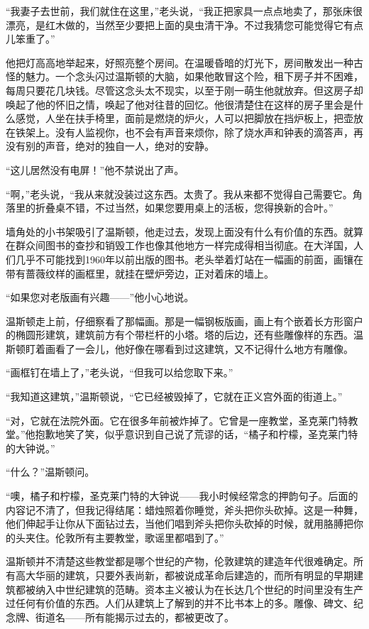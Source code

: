 ``我妻子去世前，我们就住在这里，''老头说，``我正把家具一点点地卖了，那张床很漂亮，是红木做的，当然至少要把上面的臭虫清干净。不过我猜您可能觉得它有点儿笨重了。''

他把灯高高地举起来，好照亮整个房间。在温暖昏暗的灯光下，房间散发出一种古怪的魅力。一个念头闪过温斯顿的大脑，如果他敢冒这个险，租下房子并不困难，每周只要花几块钱。尽管这念头太不现实，以至于刚一萌生他就放弃。但这房子却唤起了他的怀旧之情，唤起了他对往昔的回忆。他很清楚住在这样的房子里会是什么感觉，人坐在扶手椅里，面前是燃烧的炉火，人可以把脚放在挡炉板上，把壶放在铁架上。没有人监视你，也不会有声音来烦你，除了烧水声和钟表的滴答声，再没有别的声音，绝对的独自一人，绝对的安静。

``这儿居然没有电屏！''他不禁说出了声。

``啊，''老头说，``我从来就没装过这东西。太贵了。我从来都不觉得自己需要它。角落里的折叠桌不错，不过当然，如果您要用桌上的活板，您得换新的合叶。''

墙角处的小书架吸引了温斯顿，他走过去，发现上面没有什么有价值的东西。就算在群众间图书的查抄和销毁工作也像其他地方一样完成得相当彻底。在大洋国，人们几乎不可能找到1960年以前出版的图书。老头举着灯站在一幅画的前面，画镶在带有蔷薇纹样的画框里，就挂在壁炉旁边，正对着床的墙上。

``如果您对老版画有兴趣——''他小心地说。

温斯顿走上前，仔细察看了那幅画。那是一幅钢板版画，画上有个嵌着长方形窗户的椭圆形建筑，建筑前方有个带栏杆的小塔。塔的后边，还有些雕像样的东西。温斯顿盯着画看了一会儿，他好像在哪看到过这建筑，又不记得什么地方有雕像。

``画框钉在墙上了，''老头说，``但我可以给您取下来。''

``我知道这建筑，''温斯顿说，``它已经被毁掉了，它就在正义宫外面的街道上。''

``对，它就在法院外面。它在很多年前被炸掉了。它曾是一座教堂，圣克莱门特教堂。''他抱歉地笑了笑，似乎意识到自己说了荒谬的话，``橘子和柠檬，圣克莱门特的大钟说。''

``什么？''温斯顿问。

``噢，橘子和柠檬，圣克莱门特的大钟说——我小时候经常念的押韵句子。后面的内容记不清了，但我记得结尾：蜡烛照着你睡觉，斧头把你头砍掉。这是一种舞，他们伸起手让你从下面钻过去，当他们唱到斧头把你头砍掉的时候，就用胳膊把你的头夹住。伦敦所有主要教堂，歌谣里都唱到了。''

温斯顿并不清楚这些教堂都是哪个世纪的产物，伦敦建筑的建造年代很难确定。所有高大华丽的建筑，只要外表尚新，都被说成革命后建造的，而所有明显的早期建筑都被纳入中世纪建筑的范畴。资本主义被认为在长达几个世纪的时间里没有生产过任何有价值的东西。人们从建筑上了解到的并不比书本上的多。雕像、碑文、纪念牌、街道名——所有能揭示过去的，都被更改了。

